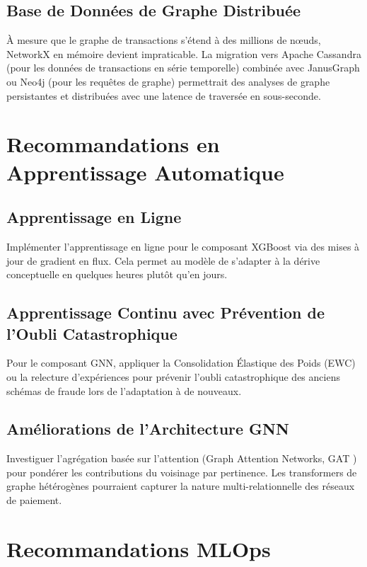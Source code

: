 \documentclass[12pt,a4paper,oneside]{book}
\theoremstyle{definition}
\theoremstyle{plain}
\begin{document}
\subsection{Base de Données de Graphe Distribuée}

À mesure que le graphe de transactions s'étend à des millions de nœuds, NetworkX en mémoire devient impraticable. La migration vers Apache Cassandra (pour les données de transactions en série temporelle) combinée avec JanusGraph ou Neo4j (pour les requêtes de graphe) permettrait des analyses de graphe persistantes et distribuées avec une latence de traversée en sous-seconde.

\section{Recommandations en Apprentissage Automatique}

\subsection{Apprentissage en Ligne}

Implémenter l'apprentissage en ligne pour le composant XGBoost via des mises à jour de gradient en flux. Cela permet au modèle de s'adapter à la dérive conceptuelle en quelques heures plutôt qu'en jours.

\subsection{Apprentissage Continu avec Prévention de l'Oubli Catastrophique}

Pour le composant GNN, appliquer la Consolidation Élastique des Poids (EWC) \citep{kirkpatrick2017overcoming} ou la relecture d'expériences pour prévenir l'oubli catastrophique des anciens schémas de fraude lors de l'adaptation à de nouveaux.

\subsection{Améliorations de l'Architecture GNN}

Investiguer l'agrégation basée sur l'attention (Graph Attention Networks, GAT \citep{velickovic2018graph}) pour pondérer les contributions du voisinage par pertinence. Les transformers de graphe hétérogènes pourraient capturer la nature multi-relationnelle des réseaux de paiement.

\section{Recommandations MLOps}
\end{document}
